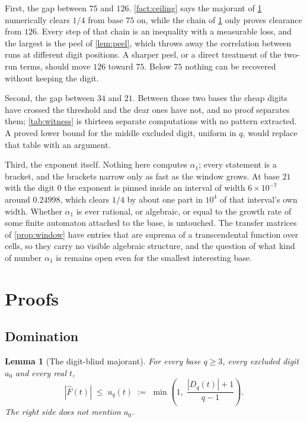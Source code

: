 \documentclass[11pt]{amsart}
\newtheorem{lemma}[theorem]{Lemma}
\theoremstyle{definition}
\theoremstyle{remark}
\begin{document}
First, the gap between $75$ and $126$. \cref{fact:ceiling} says the majorant of \cref{lem:dom} numerically clears $1/4$ from base $75$ on, while the chain of \cref{sec:proofs} only proves clearance from $126$. Every step of that chain is an inequality with a measurable loss, and the largest is the peel of \cref{lem:peel}, which throws away the correlation between runs at different digit positions. A sharper peel, or a direct treatment of the two-run terms, should move $126$ toward $75$. Below $75$ nothing can be recovered without keeping the digit.

Second, the gap between $34$ and $21$. Between those two bases the cheap digits have crossed the threshold and the dear ones have not, and no proof separates them; \cref{tab:witness} is thirteen separate computations with no pattern extracted. A proved lower bound for the middle excluded digit, uniform in $q$, would replace that table with an argument.

Third, the exponent itself. Nothing here computes $\alpha_{1}$; every statement is a bracket, and the brackets narrow only as fast as the window grows. At base $21$ with the digit $0$ the exponent is pinned inside an interval of width $6 \times 10^{-7}$ around $0.24998$, which clears $1/4$ by about one part in $10^{4}$ of that interval's own width. Whether $\alpha_{1}$ is ever rational, or algebraic, or equal to the growth rate of some finite automaton attached to the base, is untouched. The transfer matrices of \cref{prop:window} have entries that are suprema of a transcendental function over cells, so they carry no visible algebraic structure, and the question of what kind of number $\alpha_{1}$ is remains open even for the smallest interesting base.

\section{Proofs}
\label{sec:proofs}

\subsection{Domination}

\begin{lemma}[The digit-blind majorant]
\label{lem:dom}
For every base $q \ge 3$, every excluded digit $a_{0}$ and every real $t$,
\[
  |\widehat{F}(t)| \;\le\; u_{q}(t) \;:=\; \min\left(1, \; \frac{|D_{q}(t)| + 1}{q-1}\right).
\]
The right side does not mention $a_{0}$.
\end{lemma}
\end{document}
